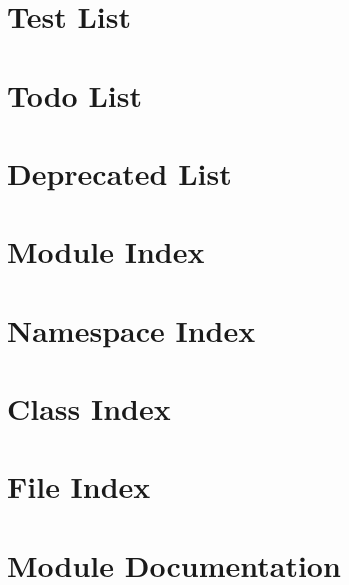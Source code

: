 \let\mypdfximage\pdfximage\def\pdfximage{\immediate\mypdfximage}\documentclass[twoside]{book}
\newcommand{\+}{\discretionary{\mbox{\scriptsize$\hookleftarrow$}}{}{}}
\begin{document}
\chapter{Test List}
\label{test}

\chapter{Todo List}
\label{todo}

\chapter{Deprecated List}
\label{deprecated}

\chapter{Module Index}

\chapter{Namespace Index}

\chapter{Class Index}

\chapter{File Index}

\chapter{Module Documentation}

















































\end{document}
